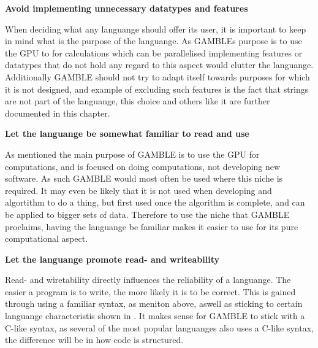 \textbf{Avoid implementing unnecessary datatypes and features}

When deciding what any languange should offer its user, it is important to keep in mind what is the purpose of the languange.
As GAMBLEs purpose is to use the GPU to for calculations which can be parallelised implementing features or datatypes that do not hold any regard to this aspect would clutter the languange.
Additionally GAMBLE should not try to adapt itself towards purposes for which it is not designed, and example of excluding such features is the fact that strings are not part of the languange, this choice and others like it are further documented in this chapter.

\textbf{Let the languange be somewhat familiar to read and use}

As mentioned the main purpose of GAMBLE is to use the GPU for computations, and is focused on doing computations, not developing new software.
As such GAMBLE would most often be used where this niche is required.
It may even be likely that it is not used when developing and algortithm to do a thing, but first used once the algorithm is complete, and can be applied to bigger sets of data.
Therefore to use the niche that GAMBLE proclaims, having the languange be familiar makes it easier to use for its pure computational aspect.

\textbf{Let the languange promote read- and writeability}

Read- and wiretability directly influences the reliability of a languange. 
The easier a program is to write, the more likely it is to be correct.\citep{Sebesta}
This is gained through using a familiar syntax, as meniton above, aswell as sticking to certain languange characteristis shown in \myref{}. 
It makes sense for GAMBLE to stick with a C-like syntax, as several of the most popular languanges also uses a C-like syntax, the difference will be in how code is structured.\citep{TIOBE}